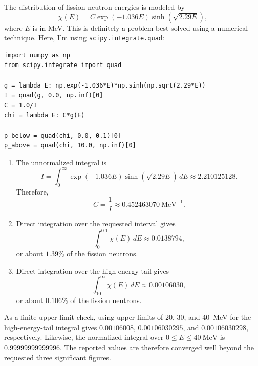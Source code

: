 \begin{adaptedsolution}
The distribution of fission-neutron energies is modeled by
\[
 \chi(E)=C\exp(-1.036E)\sinh(\sqrt{2.29E}),
\]
where $E$ is in MeV. This is definitely a problem best solved using a
numerical technique. Here, I'm using \texttt{scipy.integrate.quad}:
\begin{verbatim}
import numpy as np
from scipy.integrate import quad

g = lambda E: np.exp(-1.036*E)*np.sinh(np.sqrt(2.29*E))
I = quad(g, 0.0, np.inf)[0]
C = 1.0/I
chi = lambda E: C*g(E)

p_below = quad(chi, 0.0, 0.1)[0]
p_above = quad(chi, 10.0, np.inf)[0]
\end{verbatim}

\begin{enumerate}[label=(\alph*)]
\item The unnormalized integral is
\[
 I=\int_0^\infty
 \exp(-1.036E)\sinh(\sqrt{2.29E})\,dE
 \approx2.210125128.
\]
Therefore,
\[
 \boxed{C=\frac{1}{I}\approx0.452463070~\mathrm{MeV^{-1}}}.
\]

\item Direct integration over the requested interval gives
\[
 \int_0^{0.1}\chi(E)\,dE
 \approx\boxed{0.0138794},
\]
or about $1.39\%$ of the fission neutrons.

\item Direct integration over the high-energy tail gives
\[
 \int_{10}^{\infty}\chi(E)\,dE
 \approx\boxed{0.00106030},
\]
or about $0.106\%$ of the fission neutrons.
\end{enumerate}

As a finite-upper-limit check, using upper limits of 20, 30, and 40~MeV for
the high-energy-tail integral gives $0.00106008$, $0.00106030295$, and
$0.00106030298$, respectively. Likewise, the normalized integral over
$0\leq E\leq40~\mathrm{MeV}$ is $0.99999999999996$. The reported values are
therefore converged well beyond the requested three significant figures.
\end{adaptedsolution}

\clearpage
